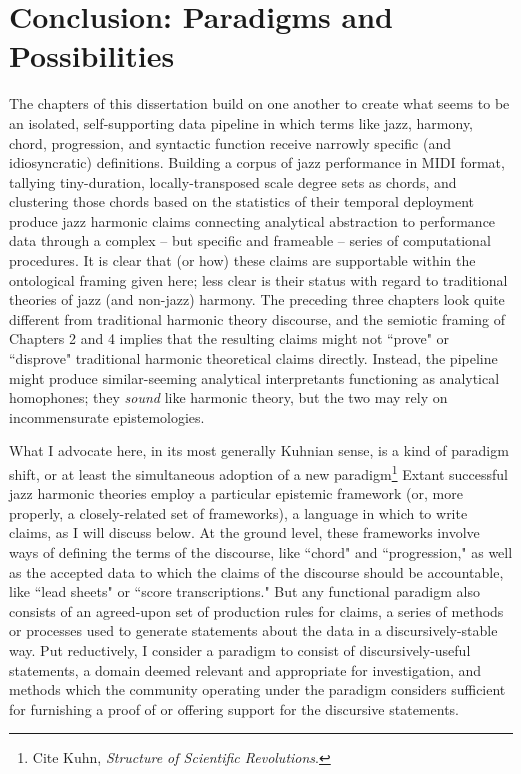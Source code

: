 \chapter{Conclusion: Paradigms and Possibilities}
The chapters of this dissertation build on one another to create what seems to be an isolated, self-supporting data pipeline in which terms like jazz, harmony, chord, progression, and syntactic function receive narrowly specific (and idiosyncratic) definitions.  Building a corpus of jazz performance in MIDI format, tallying tiny-duration, locally-transposed scale degree sets as chords, and clustering those chords based on the statistics of their temporal deployment produce jazz harmonic claims connecting analytical abstraction to performance data through a complex -- but specific and frameable -- series of computational procedures.  It is clear that (or how) these claims are supportable within the ontological framing given here; less clear is their status with regard to traditional theories of jazz (and non-jazz) harmony.  The preceding three chapters look quite different from traditional harmonic theory discourse, and the semiotic framing of Chapters 2 and 4 implies that the resulting claims might not ``prove" or ``disprove" traditional harmonic theoretical claims directly.  Instead, the pipeline might produce similar-seeming analytical interpretants functioning as analytical homophones; they \emph{sound} like harmonic theory, but the two may rely on incommensurate epistemologies.

What I advocate here, in its most generally Kuhnian sense, is a kind of paradigm shift, or at least the simultaneous adoption of a new paradigm\footnote{Cite Kuhn, \emph{Structure of Scientific Revolutions}.}  Extant successful jazz harmonic theories employ a particular epistemic framework (or, more properly, a closely-related set of frameworks), a language in which to write claims, as I will discuss below.  At the ground level, these frameworks involve ways of defining the terms of the discourse, like ``chord" and ``progression," as well as the accepted data to which the claims of the discourse should be accountable, like ``lead sheets" or ``score transcriptions."  But any functional paradigm also consists of an agreed-upon set of production rules for claims, a series of methods or processes used to generate statements about the data in a discursively-stable way.  Put reductively, I consider a paradigm to consist of discursively-useful statements, a domain deemed relevant and appropriate for investigation, and methods which the community operating under the paradigm considers sufficient for furnishing a proof of or offering support for the discursive statements.

